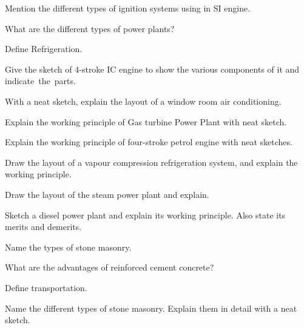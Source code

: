 \ene

\newpage \again

\sectionB

\partA

\iitem Mention the different types of ignition systems using in SI
  engine. 
\item What are the different types of power plants? 
\item Define Refrigeration. \marka

\partBt

\item Give the sketch of 4-stroke IC engine to show the various components
  of it and indicate~the~parts.

\item With a neat sketch, explain the layout of a window room air
  conditioning. 
\item Explain the working principle of Gas turbine Power Plant with neat
  sketch. 

\partCo

\item \iitem Explain the working principle of four-stroke petrol engine with
  neat sketches. 
\Or
\item Draw the layout of a vapour compression refrigeration system, and explain
  the working principle. 
\ene

\item \iitem Draw the layout of the steam power plant and explain. 
\Or
\item Sketch a diesel power plant and explain its working principle. Also state
  its merits and demerits. 
\ene

\ene

\newpage

\sub{\subj}
\maxtime

\sectionall

\sectionA

\partA

\iitem Name the types of stone masonry. 
\item What are the advantages of reinforced cement concrete?  
\item Define transportation.  \marka

\partBt

\item 
  Name the different types of stone masonry. Explain them in detail with a neat sketch.

